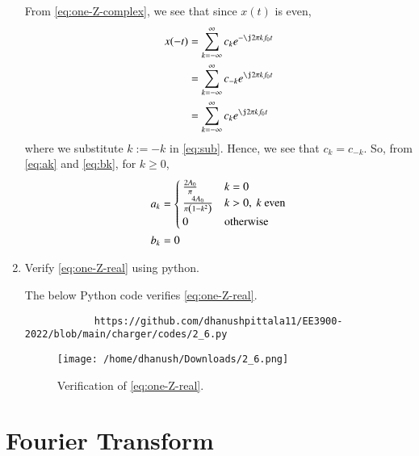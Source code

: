 \documentclass[journal,12pt,twocolumn]{IEEEtran}
\renewcommand\thesection{\arabic{section}}
\begin{document}
\begin{enumerate}[label=\thesection.\arabic*,ref=\thesection.\theenumi]
		\solution From \eqref{eq:one-Z-complex}, we see that since $x(t)$ is even,
		\begin{align}
			x(-t) &= \sum_{k = -\infty}^{\infty}c_ke^{-\j2\pi kf_0 t} \\
			&= \sum_{k = -\infty}^{\infty}c_{-k}e^{\j2\pi kf_0t} \label{eq:sub} \\
			&= \sum_{k = -\infty}^{\infty}c_ke^{\j2\pi kf_0 t}
		\end{align}
		where we substitute $k := -k$ in \eqref{eq:sub}. Hence, we see that 
		$c_k = c_{-k}$. So, from \eqref{eq:ak} and \eqref{eq:bk}, for $k \ge 0$,
		\begin{align}
			a_k &= 
			\begin{cases}
				\frac{2A_0}{\pi} & k = 0 \\
				\frac{4A_0}{\pi\brak{1 - k^2}} & k > 0,\ k\ \text{even} \\
				0 & \text{otherwise}
			\end{cases} \label{eq:ak-xt}\\
			b_k &= 0
			\label{eq:bk-xt}
		\end{align}
		\item Verify 
		\eqref{eq:one-Z-real}
		using python.
		
		\solution The below Python code verifies \eqref{eq:one-Z-real}.
		\begin{lstlisting}
			https://github.com/dhanushpittala11/EE3900-2022/blob/main/charger/codes/2_6.py
		\end{lstlisting}
		\begin{figure}[!ht]
			\texttt{[image: /home/dhanush/Downloads/2\_6.png]}
			\caption{Verification of \eqref{eq:one-Z-real}.}
			\label{fig:ver-real}
		\end{figure}
	\end{enumerate}
	\section{Fourier Transform}
	
\end{document}
